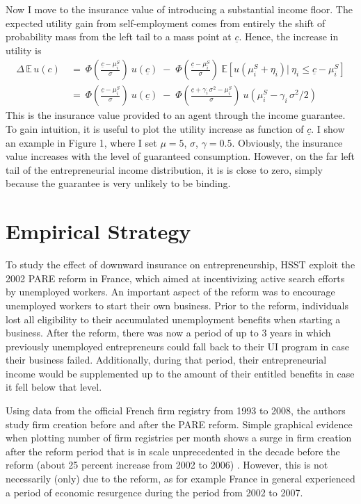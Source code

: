 \noindent Now I move to the insurance value of introducing a substantial income floor. The expected utility gain from self-employment comes from entirely the shift of probability mass from the left tail to a mass point at $\underline{c}$. Hence, the increase in utility is
\begin{align}
\Delta \,	\mathbb{E}\, u(c) \: & = \: \Phi\left(\frac{\underline{c} - \mu^S_i}{\sigma}\right) \: u(\underline{c}) \; - \; \Phi\left(\frac{\underline{c} - \mu_i^S}{\sigma}\right) \: \mathbb{E}\left[ u\left(\mu_i^S + \eta_i \right) | \:\eta_i \leq \underline{c} - \mu_i^S  \right]  \\[6pt]
& = \: \Phi\left(\frac{\underline{c} - \mu_i^S}{\sigma}\right) \: u(\underline{c}) \; - \; \Phi\left(\frac{\underline{c} + \gamma_i \, \sigma^2 - \mu_i^S}{\sigma}\right) \: u\left(\mu_i^S -  \gamma_i \,  \sigma^2 /2 \right)
\end{align}
This is the insurance value provided to an agent through the income guarantee. To gain intuition, it is useful to plot the utility increase as function of $\underline{c}$. I show an example in Figure 1, where I set $\mu = 5$, $\sigma$, $\gamma = 0.5$. 
Obviously, the insurance value increases with the level of guaranteed consumption. However, on the far left tail of the entrepreneurial income distribution, it is is close to zero, simply because the guarantee is very unlikely to be binding. 

\section{Empirical Strategy}

To study the effect of downward insurance on entrepreneurship, HSST exploit the 2002 PARE reform in France, which aimed at incentivizing active search efforts by unemployed workers. An important aspect of the reform was to encourage unemployed workers to start their own business. Prior to the reform, individuals lost all eligibility to their accumulated unemployment benefits when starting a business. After the reform, there was now a period of up to 3 years in which previously unemployed entrepreneurs could fall back to their UI program in case their business failed. Additionally, during that period, their entrepreneurial income would be supplemented up to the amount of their entitled benefits in case it fell below that level. \newline

\noindent Using data from the official French firm registry from 1993 to 2008, the authors study firm creation before and after the PARE reform. Simple graphical evidence when plotting number of firm registries per month shows a surge in firm creation after the reform period that is in scale unprecedented in the decade before the reform (about 25 percent increase from 2002 to 2006) . However, this is not necessarily (only) due to the reform, as for example France in general experienced a period of economic resurgence during the period from 2002 to 2007. 

